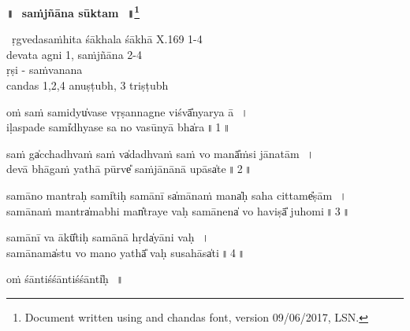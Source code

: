\documentclass[parskip, 12pt, DIV=16, pagenumber=head,top, enableddeprecatedfontcommands]{scrartcl}
\renewcommand{\thefootnote}{\fnsymbol{footnote}} %
\begin{document}

\vspace{-1.5cm}

\begin{center}
\textbf{{\Huge॥\,~saṁjñāna sūktam\,~॥\LARGE\let\thefootnote\relax\footnote{\color{lightgray} Document written using \XeLaTeX{} and chandas font, version 09/06/2017, LSN.}}}
\end{center}
\Large

\centering	

\small
~ṛgvedasaṁhita śākhala śākhā X.169 1-4\\
devata agni 1, saṁjñāna 2-4\\
ṛṣi - saṁvanana\\
candas 1,2,4 anuṣṭubh, 3 triṣṭubh\\

\vspace{1,5cm}
\Large

oṁ saṁ sa॒midyu̍vase vṛṣa॒nnagne॒ viśvā̎nya॒rya ā\,~।\\
i॒ḷaspa॒de sami̍dhyase॒ sa no॒ vasū॒nyā bha̍ra\,॥\,1\,॥

saṁ ga̍cchadhva॒ṁ saṁ va̍dadhva॒ṁ saṁ vo॒ manā̎ṁsi jānatām\,~।\\
de॒vā bhā॒gaṁ yathā॒ pūrve̎ saṁjānā॒nā u॒pāsa̍te\,॥\,2\,॥

sa॒mā॒no mantra॒ḥ sami̍tiḥ samā॒nī sa̍mā॒naṁ mana̍ḥ sa॒ha ci॒ttame̎ṣām\,~।\\
sa॒mā॒naṁ mantra̍ma॒bhi man̎traye vaḥ samā॒nena̍ vo ha॒viṣā̎ juhomi\,॥\,3\,॥

sa॒mā॒nī va॒ ākū̎tiḥ samā॒nā hṛda̍yāni vaḥ\,~।\\
sa॒mā॒nama̍stu vo॒ mano॒ yathā̎ va॒ḥ susa॒hāsa̍ti\,॥\,4\,॥

\vspace{1cm}

oṁ śānti॒śśānti॒śśānti̍ḥ~\,॥
\end{document}
